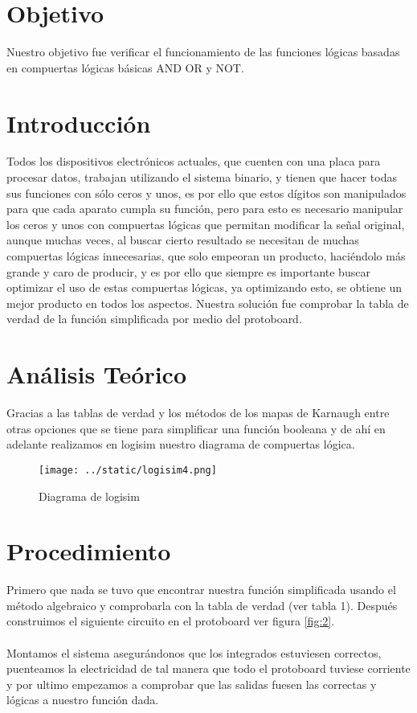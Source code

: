 \documentclass{article}
\begin{document}
\begin{multicols}{2}

\section*{Objetivo}\label{Objetivo}

Nuestro objetivo fue verificar el funcionamiento de las funciones lógicas basadas en compuertas lógicas básicas AND OR y NOT.

\section*{Introducción}\label{Introducción}

Todos los dispositivos electrónicos actuales, que cuenten con una placa para procesar datos, trabajan utilizando el sistema binario, y tienen que hacer todas sus funciones con sólo  ceros y unos, es por ello que estos dígitos son manipulados para que cada aparato cumpla su función, pero para esto es necesario manipular los ceros y unos con compuertas lógicas que permitan modificar la señal original, aunque muchas veces, al buscar cierto resultado se necesitan de muchas compuertas lógicas innecesarias, que solo empeoran un producto, haciéndolo más grande y caro de producir, y es por ello que siempre es importante buscar optimizar el uso de estas compuertas lógicas, ya optimizando esto, se obtiene un mejor producto en todos los aspectos. 
Nuestra solución fue comprobar la tabla de verdad de la función simplificada por medio del protoboard.

\section*{Análisis Teórico}\label{Análisis Teórico}
Gracias a las tablas de verdad y los métodos de los mapas de Karnaugh entre otras opciones que se tiene para simplificar una función booleana y de ahí en adelante realizamos en logisim nuestro diagrama de compuertas lógica.
\begin{figure}[H]
	\centering
	\texttt{[image: ../static/logisim4.png]}
	\caption{Diagrama de logisim}
	\label{fig:1}
\end{figure}
\section*{Procedimiento}\label{Procedimiento}
Primero que nada se tuvo que encontrar nuestra función simplificada usando el método algebraico y comprobarla con la tabla de verdad (ver tabla 1). 
Después construimos el siguiente circuito en el protoboard ver figura \ref{fig:2}.
\\
\\
Montamos el sistema asegurándonos que los integrados estuviesen correctos, puenteamos la electricidad de tal manera que todo el protoboard tuviese corriente y por ultimo empezamos a comprobar que las salidas fuesen las correctas y lógicas a nuestro función dada.
\\
\\


\end{multicols}
\end{document}
